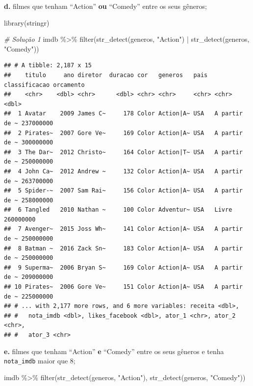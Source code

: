 \documentclass[
]{book}
\newenvironment{Shaded}{\begin{snugshade}}{\end{snugshade}}
\newcommand{\CommentTok}[1]{\textcolor[rgb]{0.56,0.35,0.01}{\textit{#1}}}
\newcommand{\FunctionTok}[1]{\textcolor[rgb]{0.00,0.00,0.00}{#1}}
\newcommand{\NormalTok}[1]{#1}
\newcommand{\SpecialCharTok}[1]{\textcolor[rgb]{0.00,0.00,0.00}{#1}}
\newcommand{\StringTok}[1]{\textcolor[rgb]{0.31,0.60,0.02}{#1}}
\begin{document}
\textbf{d.} filmes que tenham ``Action'' \textbf{ou} ``Comedy'' entre os seus gêneros;

\begin{Shaded}
\begin{Highlighting}[]
\FunctionTok{library}\NormalTok{(stringr)}

\CommentTok{\# Solução 1}
\NormalTok{imdb }\SpecialCharTok{\%\textgreater{}\%} 
  \FunctionTok{filter}\NormalTok{(}\FunctionTok{str\_detect}\NormalTok{(generos, }\StringTok{"Action"}\NormalTok{) }\SpecialCharTok{|} \FunctionTok{str\_detect}\NormalTok{(generos, }\StringTok{"Comedy"}\NormalTok{))}
\end{Highlighting}
\end{Shaded}

\begin{verbatim}
## # A tibble: 2,187 x 15
##    titulo     ano diretor  duracao cor   generos   pais  classificacao orcamento
##    <chr>    <dbl> <chr>      <dbl> <chr> <chr>     <chr> <chr>             <dbl>
##  1 Avatar    2009 James C~     178 Color Action|A~ USA   A partir de ~ 237000000
##  2 Pirates~  2007 Gore Ve~     169 Color Action|A~ USA   A partir de ~ 300000000
##  3 The Dar~  2012 Christo~     164 Color Action|T~ USA   A partir de ~ 250000000
##  4 John Ca~  2012 Andrew ~     132 Color Action|A~ USA   A partir de ~ 263700000
##  5 Spider-~  2007 Sam Rai~     156 Color Action|A~ USA   A partir de ~ 258000000
##  6 Tangled   2010 Nathan ~     100 Color Adventur~ USA   Livre         260000000
##  7 Avenger~  2015 Joss Wh~     141 Color Action|A~ USA   A partir de ~ 250000000
##  8 Batman ~  2016 Zack Sn~     183 Color Action|A~ USA   A partir de ~ 250000000
##  9 Superma~  2006 Bryan S~     169 Color Action|A~ USA   A partir de ~ 209000000
## 10 Pirates~  2006 Gore Ve~     151 Color Action|A~ USA   A partir de ~ 225000000
## # ... with 2,177 more rows, and 6 more variables: receita <dbl>,
## #   nota_imdb <dbl>, likes_facebook <dbl>, ator_1 <chr>, ator_2 <chr>,
## #   ator_3 <chr>
\end{verbatim}

\textbf{e.} filmes que tenham ``Action'' \textbf{e} ``Comedy'' entre os seus gêneros e tenha \texttt{nota\_imdb} maior que 8;

\begin{Shaded}
\begin{Highlighting}[]
\NormalTok{imdb }\SpecialCharTok{\%\textgreater{}\%} 
  \FunctionTok{filter}\NormalTok{(}\FunctionTok{str\_detect}\NormalTok{(generos, }\StringTok{"Action"}\NormalTok{), }\FunctionTok{str\_detect}\NormalTok{(generos, }\StringTok{"Comedy"}\NormalTok{))}
\end{Highlighting}
\end{Shaded}
\end{document}
